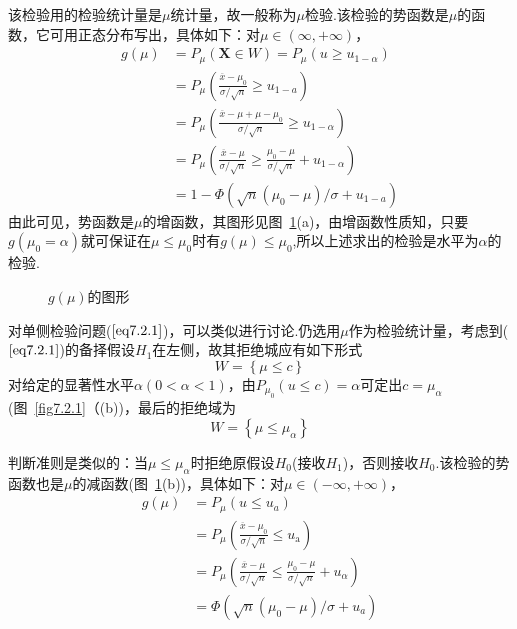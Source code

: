该检验用的检验统计量是$\mu $统计量，故一般称为$\mu $检验.该检验的势函数是$\mu $的函数，它可用正态分布写出，具体如下：对$\mu \in(\infty,+\infty)$，
\begin{align*}
g ( \mu ) &= P _ { \mu } ( \mathbf { X } \in W ) = P _ { \mu } \left( u \geq u _ { 1 - \alpha } \right)\\
&= P _ { \mu } \left( \frac { \overline { x } - \mu _ { 0 } } { \sigma / \sqrt { n } } \geq u _ { 1 - a } \right)\\
&= P _ { \mu } \left( \frac { \overline { x } - \mu + \mu - \mu _ { 0 } } { \sigma / \sqrt { n } } \geq u _ { 1 - \alpha } \right)\\
&= P _ { \mu } \left( \frac { \overline { x } - \mu } { \sigma / \sqrt { n } } \geq \frac { \mu _ { 0 } - \mu } { \sigma / \sqrt { n } } + u _ { 1 - \alpha } \right)\\
&= 1 - \Phi \left( \sqrt { n } \left( \mu _ { 0 } - \mu \right) / \sigma + u _ { 1 - a } \right)
\end{align*}
由此可见，势函数是$\mu $的增函数，其图形见图~\ref{fig7.2.2}(a)，由增函数性质知，只要$g(\mu_{0}=\alpha)$就可保证在$\mu \leq \mu_{ 0 }$时有$g(\mu )\leq \mu_{ 0 }$,所以上述求出的检验是水平为$\alpha$的检验.
\begin{figure}[htbp]
	\centering
	\caption{$g(\mu ) $的图形}\label{fig7.2.2}
\end{figure}

对单侧检验问题($\ref{eq7.2.1}$)，可以类似进行讨论.仍选用$\mu $作为检验统计量，考虑到($\ref{eq7.2.1}$)的备择假设$H_{1}$在左侧，故其拒绝城应有如下形式
\[
W=\left\{\mu\le c\right\}
\]
对给定的显著性水平$\alpha(0<\alpha<1)$，由$P _ { \mu _ { 0 } } ( u \leq c ) = \alpha$可定出$c=\mu_{\alpha}$(图~\ref{fig7.2.1}（(b))，最后的拒绝域为
\begin{equation}\label{eq7.2.7}
W=\left\{\mu\le\mu_{\alpha}\right\}
\end{equation}

判断准则是类似的：当$\mu\le\mu_{\alpha}$时拒绝原假设$H_{0}$(接收$H_{1}$)，否则接收$H_{0}$.该检验的势函数也是$\mu $的减函数(图~\ref{fig7.2.2}(b))，具体如下：对$\mu \in(-\infty,+\infty)$，
\begin{align*}
g ( \mu ) &= P _ { \mu } \left( u \leq u _ { a } \right)\\
&= P _ { \mu } \left( \frac { \overline { x } - \mu _ { 0 } } { \sigma / \sqrt { n } } \leq u _ { \mathrm { a } } \right)\\
&= P _ { \mu } \left( \frac { \overline { x } - \mu } { \sigma / \sqrt { n } } \leq \frac { \mu _ { 0 } - \mu } { \sigma / \sqrt { n } } + u _ { \alpha } \right)\\
&= \Phi \left( \sqrt { n } \left( \mu _ { 0 } - \mu \right) / \sigma + u _ { a } \right)
\end{align*}

